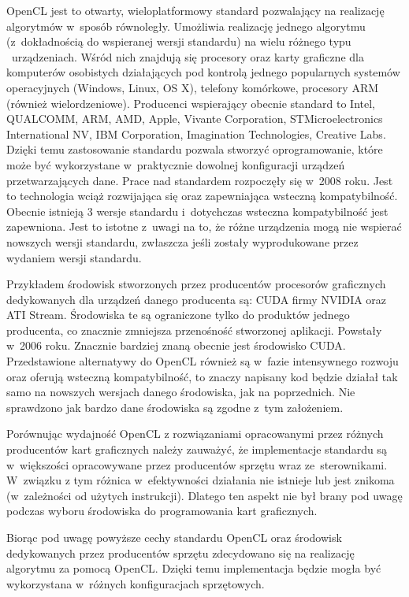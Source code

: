 OpenCL jest to otwarty, wieloplatformowy standard pozwalający na realizację algorytmów w~sposób równoległy. Umożliwia realizację jednego algorytmu (z~dokładnością do wspieranej wersji standardu) na wielu różnego typu ~urządzeniach. Wśród nich znajdują się procesory oraz karty graficzne dla komputerów osobistych działających
 pod kontrolą jednego popularnych systemów operacyjnych (Windows, Linux, OS X), telefony komórkowe, procesory ARM (również wielordzeniowe). Producenci wspierający obecnie standard to Intel,
QUALCOMM,
ARM,
AMD,
Apple,
Vivante Corporation,
STMicroelectronics International NV,
IBM Corporation,
Imagination Technologies,
Creative Labs.
Dzięki temu zastosowanie standardu pozwala stworzyć oprogramowanie, które może być wykorzystane w~praktycznie dowolnej konfiguracji urządzeń przetwarzających dane. Prace nad standardem rozpoczęły się w~2008 roku. Jest to technologia wciąż rozwijająca się oraz zapewniająca wsteczną kompatybilność. Obecnie istnieją 3 wersje standardu i~dotychczas wsteczna kompatybilność jest zapewniona. Jest to istotne z~uwagi na to, że różne urządzenia mogą nie wspierać nowszych wersji standardu, zwłaszcza jeśli zostały wyprodukowane przez wydaniem wersji standardu.

Przykładem środowisk stworzonych przez producentów procesorów graficznych dedykowanych dla urządzeń danego producenta są: CUDA firmy NVIDIA oraz ATI Stream. Środowiska te są ograniczone tylko do produktów jednego producenta, co znacznie zmniejsza przenośność stworzonej aplikacji. Powstały w~2006 roku. Znacznie bardziej znaną obecnie jest środowisko CUDA. Przedstawione alternatywy do OpenCL również są w~fazie intensywnego rozwoju oraz oferują wsteczną kompatybilność, to znaczy napisany kod będzie działał tak samo na nowszych wersjach danego środowiska, jak na poprzednich. Nie sprawdzono jak bardzo dane środowiska są zgodne z~tym założeniem.

Porównując wydajność OpenCL z rozwiązaniami opracowanymi przez różnych producentów kart graficznych należy zauważyć, że implementacje standardu są w~większości opracowywane przez producentów sprzętu wraz ze~sterownikami. W~związku z tym różnica w~efektywności działania nie istnieje lub jest znikoma (w~zależności od użytych instrukcji)\cite{FromCudaToOpenCL}. Dlatego ten aspekt nie był brany pod uwagę podczas wyboru środowiska do programowania kart graficznych.

Biorąc pod uwagę powyższe cechy standardu OpenCL oraz środowisk dedykowanych przez producentów sprzętu zdecydowano się na realizację algorytmu za pomocą OpenCL. Dzięki temu implementacja będzie mogła być wykorzystana w~różnych konfiguracjach sprzętowych.


